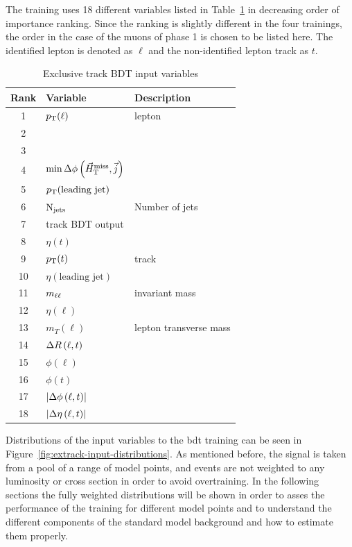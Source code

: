 The training uses 18 different variables listed in Table~\ref{tab:extrack-bdt-variables} in decreasing order of importance ranking. Since the ranking is slightly different in the four trainings, the order in the case of the muons of phase 1 is chosen to be listed here. The identified lepton is denoted as $\ell$ and the non-identified lepton track as $t$.

\begin{table}[!htb]
	\centering
	\label{tab:extrack-bdt-variables}
		\caption{Exclusive track BDT input variables}
			\begin{tabular}{cll} \hline
			Rank & Variable & Description \\ \hline
			1 & $p_{\mathrm{T}}(\ell)$ & lepton \pt\\
			2 & \HT & \\
			3 & \mht & \\
			4 & $\min{\Delta\phi\left(\ensuremath{\vec{H}_{\text{T}}^{\text{miss}}},\vec{j}\right)}$ & \\
			5 & $p_{\mathrm{T}}(\text{leading jet})$ & \\
			6 & $\mathrm{N}_{\mathrm{jets}}$ & Number of jets \\					7 & track BDT output & \\
			8 & $\eta(t)$ & \\
			9 & $p_{\mathrm{T}}(t)$ & track \pt\\
			10 & $\eta(\text{leading jet})$ & \\				11 & $m_{\ell\ell}$ & invariant mass \\
			12 & $\eta(\ell)$ & \\
			13 & $m_T(\ell)$ & lepton transverse mass\\			
			14 & $\Delta R\left(\ell, t\right)$ & \\
			15 & $\phi(\ell)$ & \\
			16 & $\phi(t)$ & \\
			17 & $\abs{\Delta\phi\left(\ell,t \right)}$ & \\			
			18 & $\abs{\Delta \eta \left(\ell, t\right) }$ & \\			
			\hline
			\end{tabular}
\end{table}

Distributions of the input variables to the \gls{bdt} training can be seen in Figure~\ref{fig:extrack-input-distributions}. As mentioned before, the signal is taken from a pool of a range of model points, and events are not weighted to any luminosity or cross section in order to avoid overtraining. In the following sections the fully weighted distributions will be shown in order to asses the performance of the training for different model points and to understand the different components of the standard model background and how to estimate them properly.

